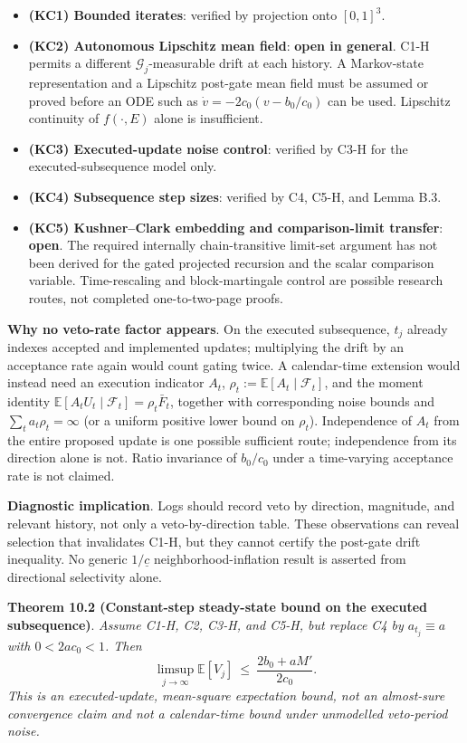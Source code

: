 \documentclass[
  11pt]{article}
\providecommand{\tightlist}{%
  \setlength{\itemsep}{0pt}\setlength{\parskip}{0pt}}
\begin{document}
\begin{itemize}
\tightlist
\item
  \textbf{(KC1) Bounded iterates}: verified by projection onto
  \([0,1]^3\).
\item
  \textbf{(KC2) Autonomous Lipschitz mean field}: \textbf{open in
  general}. C1-H permits a different \(\mathcal G_j\)-measurable drift
  at each history. A Markov-state representation and a Lipschitz
  post-gate mean field must be assumed or proved before an ODE such as
  \(\dot v=-2c_0(v-b_0/c_0)\) can be used. Lipschitz continuity of
  \(f(\cdot,E)\) alone is insufficient.
\item
  \textbf{(KC3) Executed-update noise control}: verified by C3-H for the
  executed-subsequence model only.
\item
  \textbf{(KC4) Subsequence step sizes}: verified by C4, C5-H, and Lemma
  B.3.
\item
  \textbf{(KC5) Kushner--Clark embedding and comparison-limit transfer}:
  \textbf{open}. The required internally chain-transitive limit-set
  argument has not been derived for the gated projected recursion and
  the scalar comparison variable. Time-rescaling and block-martingale
  control are possible research routes, not completed one-to-two-page
  proofs.
\end{itemize}

\textbf{Why no veto-rate factor appears}. On the executed subsequence,
\(t_j\) already indexes accepted and implemented updates; multiplying
the drift by an acceptance rate again would count gating twice. A
calendar-time extension would instead need an execution indicator
\(A_t\), \(\rho_t:=\mathbb E[A_t\mid\mathcal F_t]\), and the moment
identity \(\mathbb E[A_tU_t\mid\mathcal F_t]=\rho_t\bar F_t\), together
with corresponding noise bounds and \(\sum_ta_t\rho_t=\infty\) (or a
uniform positive lower bound on \(\rho_t\)). Independence of \(A_t\)
from the entire proposed update is one possible sufficient route;
independence from its direction alone is not. Ratio invariance of
\(b_0/c_0\) under a time-varying acceptance rate is not claimed.

\textbf{Diagnostic implication}. Logs should record veto by direction,
magnitude, and relevant history, not only a veto-by-direction table.
These observations can reveal selection that invalidates C1-H, but they
cannot certify the post-gate drift inequality. No generic
\(1/\underline c\) neighborhood-inflation result is asserted from
directional selectivity alone.

\textbf{Theorem 10.2 (Constant-step steady-state bound on the executed
subsequence)}. \emph{Assume C1-H, C2, C3-H, and C5-H, but replace C4 by
\(a_{t_j}\equiv a\) with \(0<2ac_0<1\). Then}
\[\limsup_{j\to\infty}\mathbb E[V_j]\ \le\ \frac{2b_0+aM'}{2c_0}.\]
\emph{This is an executed-update, mean-square expectation bound, not an
almost-sure convergence claim and not a calendar-time bound under
unmodelled veto-period noise.}
\end{document}
